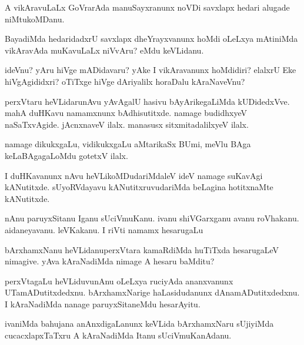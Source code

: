 \begin{mng}
A vikAravuLaLx GoVrarAda manuSayxranunx noVDi savxlapx hedari alugade niMtukoMDanu.
\end{mng}

\begin{mng}
BayadiMda hedaridadxrU savxlapx dheYrayxvanunx hoMdi oLeLxya mAtiniMda vikAravAda muKavuLaLx niVvAru? eMdu keVLidanu.
\end{mng}

\begin{mng}
ideVnu? yAru hiVge mADidavaru? yAke I vikAravanunx hoMdidiri? elalxrU Eke hiVgAgididxri? oTiTxge hiVge dAriyalilx horaDalu kAraNaveVnu?
\end{mng}

\begin{mng}
perxVtaru heVLidaru\mdash nAvu yAvAgalU hasivu bAyArikegaLiMda kUDidedxVve. mahA duHKavu namamxnunx bAdhisutitxde. namage budidhxyeV naSaTxvAgide. jAcnxnaveV ilalx. manasusx sitxmitadalilxyeV ilalx.
\end{mng}

\begin{mng}
namage dikukxgaLu, vidikukxgaLu aMtarikaSx BUmi, meVlu BAga keLaBAgagaLoMdu gotetxV ilalx.
\end{mng}

\begin{mng}
I duHKavanunx nAvu heVLikoMDudariMdaleV ideV namage suKavAgi kANutitxde. sUyoRVdayavu kANutitxruvudariMda beLagina hotitxnaMte kANutitxde.
\end{mng}

\begin{mng}
nAnu paruyxSitanu Iganu sUciVmuKanu. ivanu shiVGarxganu avanu roVhakanu. aidaneyavanu. leVKakanu. I riVti namamx hesarugaLu
\end{mng}

\begin{mng}
bArxhamxNanu heVLidanu\mdash perxVtara kamaRdiMda huTiTxda hesarugaLeV nimagive. yAva kAraNadiMda nimage A hesaru baMditu?
\end{mng}

\begin{mng}
perxVtagaLu heVLiduvu\mdash nAnu oLeLxya ruciyAda ananxvanunx UTamADutitxdedxnu. bArxhamxNarige haLasidudanunx dAnamADutitxdedxnu. I kAraNadiMda nanage paruyxSitaneMdu hesarAyitu.
\end{mng}

\begin{mng}
ivaniMda bahujana anAnxdigaLanunx keVLida bArxhamxNaru sUjiyiMda cucacxlapxTaTxru A kAraNadiMda Itanu sUciVmuKanAdanu.
\end{mng}

